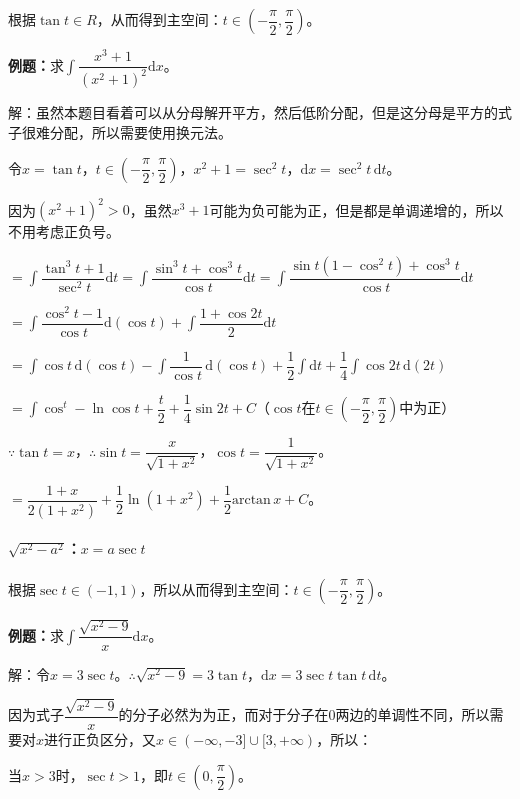 \documentclass[UTF8, 12pt]{ctexart}
\begin{document}
根据$\tan t\in R$，从而得到主空间：$t\in\left(-\dfrac{\pi}{2},\dfrac{\pi}{2}\right)$。

\textbf{例题：}求$\displaystyle{\int\dfrac{x^3+1}{(x^2+1)^2}\textrm{d}x}$。\medskip

解：虽然本题目看着可以从分母解开平方，然后低阶分配，但是这分母是平方的式子很难分配，所以需要使用换元法。

令$x=\tan t$，$t\in\left(-\dfrac{\pi}{2},\dfrac{\pi}{2}\right)$，$x^2+1=\sec^2t$，$\textrm{d}x=\sec^2t\,\textrm{d}t$。

因为$(x^2+1)^2>0$，虽然$x^3+1$可能为负可能为正，但是都是单调递增的，所以不用考虑正负号。

$=\displaystyle{\int\dfrac{\tan^3t+1}{\sec^2t}\textrm{d}t=\int\dfrac{\sin^3t+\cos^3t}{\cos t}\textrm{d}t=\int\dfrac{\sin t(1-\cos^2t)+\cos^3t}{\cos t}\textrm{d}t}$

$=\displaystyle{\int\dfrac{\cos^2t-1}{\cos t}\textrm{d}(\cos t)+\int\dfrac{1+\cos2t}{2}\textrm{d}t}$

$=\displaystyle{\int\cos t\,\textrm{d}(\cos t)-\int\dfrac{1}{\cos t}\,\textrm{d}(\cos t)+\dfrac{1}{2}\int\textrm{d}t+\dfrac{1}{4}\int\cos2t\,\textrm{d}(2t)}$

$=\displaystyle{\int\cos^t-\ln\cos t+\dfrac{t}{2}+\dfrac{1}{4}\sin2t+C}$（$\cos t$在$t\in\left(-\dfrac{\pi}{2},\dfrac{\pi}{2}\right)$中为正）

$\because\tan t=x$，$\therefore\sin t=\dfrac{x}{\sqrt{1+x^2}}$，$\cos t=\dfrac{1}{\sqrt{1+x^2}}$。

$=\dfrac{1+x}{2(1+x^2)}+\dfrac{1}{2}\ln(1+x^2)+\dfrac{1}{2}\textrm{arctan}\,x+C$。

\paragraph{\texorpdfstring{$\sqrt{x^2-a^2}$：$x=a\sec t$}\ } \leavevmode \medskip

根据$\sec t\in(-1,1)$，所以从而得到主空间：$t\in\left(-\dfrac{\pi}{2},\dfrac{\pi}{2}\right)$。\medskip

\textbf{例题：}求$\displaystyle{\int\dfrac{\sqrt{x^2-9}}{x}\textrm{d}x}$。

解：令$x=3\sec t$。$\therefore\sqrt{x^2-9}=3\tan t$，$\textrm{d}x=3\sec t\tan t\,\textrm{d}t$。\medskip

因为式子$\dfrac{\sqrt{x^2-9}}{x}$的分子必然为为正，而对于分子在0两边的单调性不同，所以需要对$x$进行正负区分，又$x\in(-\infty,-3]\cup[3,+\infty)$，所以：

当$x>3$时，$\sec t>1$，即$t\in\left(0,\dfrac{\pi}{2}\right)$。
\end{document}
